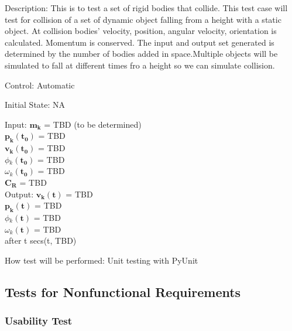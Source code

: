 \documentclass[12pt, titlepage]{article}
\begin{document}
\begin{enumerate}
Description: This is to test a set of rigid bodies that collide. This test case will test for collision of a set of dynamic object falling from a height with a static object. At collision bodies' velocity, position, angular velocity, orientation is calculated. Momentum is conserved. The input and output set generated is determined by the number of bodies added in space.Multiple objects will be simulated to fall at different times fro a height so we can simulate collision.

Control: Automatic

Initial State: NA

Input: $\mathbf{m_k}$$\mathbf{}$ = TBD (to be determined)\\
\hspace*{1.3cm}$\mathbf{p_k}$$\mathbf{(t_0)}$ = TBD\\
\hspace*{1.3cm}$\mathbf{v_k}$$\mathbf{(t_0)}$ = TBD\\
\hspace*{1.3cm}$\phi$$_k\mathbf{(t_0)}$ = TBD\\
\hspace*{1.3cm}$\omega$$_k\mathbf{(t_0)}$$ \mathbf{}$ = TBD\\
\hspace*{1.3cm}$\mathbf{C_R}$$\mathbf{}$ = TBD \\


Output:  $\mathbf{v_k}$$\mathbf{(t)}$ = TBD \\
\hspace*{1.3cm}$\mathbf{p_k}$$\mathbf{(t)}$ = TBD\\
\hspace*{1.3cm}$\phi$$_k\mathbf{(t)}$ = TBD\\
\hspace*{1.3cm}$\omega$$_k\mathbf{(t)}$$ \mathbf{}$ = TBD\\
after t secs(t, TBD) 


How test will be performed: Unit testing with PyUnit



\end{enumerate}	
	


\subsection{Tests for Nonfunctional Requirements}

\subsubsection{Usability Test}
		
\end{document}
